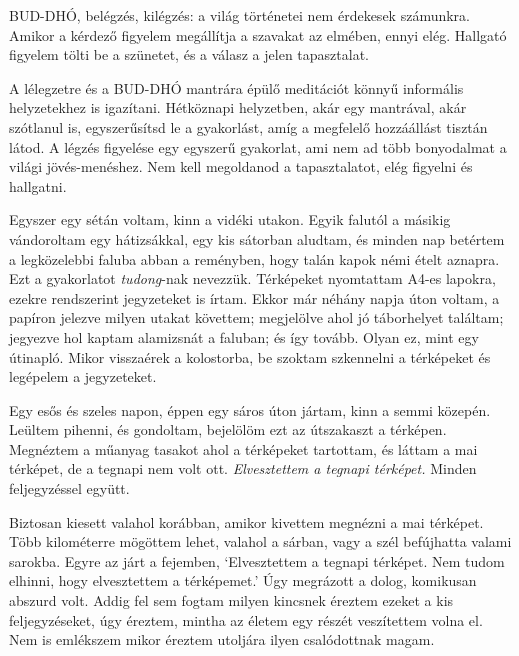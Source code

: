 
BUD-DHÓ, belégzés, kilégzés: a világ történetei nem érdekesek számunkra.
Amikor a kérdező figyelem megállítja a szavakat az elmében, ennyi elég.
Hallgató figyelem tölti be a szünetet, és a válasz a jelen tapasztalat.

\enlargethispage*{2\baselineskip}

A lélegzetre és a BUD-DHÓ mantrára épülő meditációt könnyű informális
helyzetekhez is igazítani. Hétköznapi helyzetben, akár egy mantrával,
akár szótlanul is, egyszerűsítsd le a gyakorlást, amíg a megfelelő
hozzáállást tisztán látod. A légzés figyelése egy egyszerű gyakorlat,
ami nem ad több bonyodalmat a világi jövés-menéshez. Nem kell megoldanod
a tapasztalatot, elég figyelni és hallgatni.

\clearpage

\vspace*{-\baselineskip}


Egyszer egy sétán voltam, kinn a vidéki utakon. Egyik falutól a másikig
vándoroltam egy hátizsákkal, egy kis sátorban aludtam, és minden nap
betértem a legközelebbi faluba abban a reményben, hogy talán kapok némi
ételt aznapra. Ezt a gyakorlatot \emph{tudong}-nak nevezzük. Térképeket
nyomtattam A4-es lapokra, ezekre rendszerint jegyzeteket is írtam. Ekkor
már néhány napja úton voltam, a papíron jelezve milyen utakat követtem;
megjelölve ahol jó táborhelyet találtam; jegyezve hol kaptam alamizsnát
a faluban; és így tovább. Olyan ez, mint egy útinapló. Mikor visszaérek
a kolostorba, be szoktam szkennelni a térképeket és legépelem a
jegyzeteket.

Egy esős és szeles napon, éppen egy sáros úton jártam, kinn a semmi
közepén. Leültem pihenni, és gondoltam, bejelölöm ezt az útszakaszt a
térképen. Megnéztem a műanyag tasakot ahol a térképeket tartottam, és
láttam a mai térképet, de a tegnapi nem volt ott. \emph{Elvesztettem a
tegnapi térképet.} Minden feljegyzéssel együtt.

Biztosan kiesett valahol korábban, amikor kivettem megnézni a mai
térképet. Több kilométerre mögöttem lehet, valahol a sárban, vagy a szél
befújhatta valami sarokba. Egyre az járt a fejemben, `Elvesztettem a
tegnapi térképet. Nem tudom elhinni, hogy elvesztettem a térképemet.'
Úgy megrázott a dolog, komikusan abszurd volt. Addig fel sem fogtam
milyen kincsnek éreztem ezeket a kis feljegyzéseket, úgy éreztem, mintha
az életem egy részét veszítettem volna el. Nem is emlékszem mikor
éreztem utoljára ilyen csalódottnak magam.

